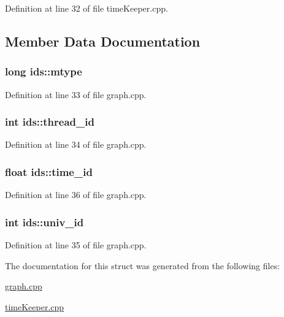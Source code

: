 \-Definition at line 32 of file time\-Keeper.\-cpp.



\subsection{\-Member \-Data \-Documentation}
\hypertarget{structids_a3d5032b0a881c3e7d2125d33fe0e1d44}{
\subsubsection[{mtype}]{\setlength{\rightskip}{0pt plus 5cm}long {\bf ids\-::mtype}}}\label{structids_a3d5032b0a881c3e7d2125d33fe0e1d44}


\-Definition at line 33 of file graph.\-cpp.

\hypertarget{structids_a5bf7aecc01dd3524925692603449d35b}{
\subsubsection[{thread\-\_\-id}]{\setlength{\rightskip}{0pt plus 5cm}int {\bf ids\-::thread\-\_\-id}}}\label{structids_a5bf7aecc01dd3524925692603449d35b}


\-Definition at line 34 of file graph.\-cpp.

\hypertarget{structids_a9526599eedc1bfda377bf3f64ec28554}{
\subsubsection[{time\-\_\-id}]{\setlength{\rightskip}{0pt plus 5cm}float {\bf ids\-::time\-\_\-id}}}\label{structids_a9526599eedc1bfda377bf3f64ec28554}


\-Definition at line 36 of file graph.\-cpp.

\hypertarget{structids_adb5745175f025a93b2829778c902022a}{
\subsubsection[{univ\-\_\-id}]{\setlength{\rightskip}{0pt plus 5cm}int {\bf ids\-::univ\-\_\-id}}}\label{structids_adb5745175f025a93b2829778c902022a}


\-Definition at line 35 of file graph.\-cpp.



\-The documentation for this struct was generated from the following files\-:\begin{DoxyCompactItemize}
\item 
\hyperlink{graph_8cpp}{graph.\-cpp}\item 
\hyperlink{timeKeeper_8cpp}{time\-Keeper.\-cpp}\end{DoxyCompactItemize}

